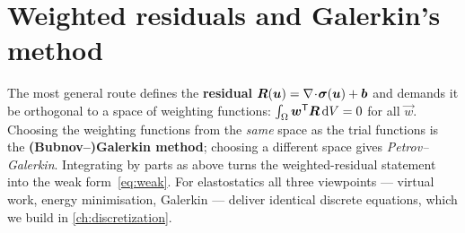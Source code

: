 \section{Weighted residuals and Galerkin's method}

The most general route defines the \textbf{residual}
$\bm{R}(\bm{u})=\nabla\!\cdot\!\bm{\sigma}(\bm{u})+\bm{b}$ and demands it be
orthogonal to a space of weighting functions:
$\int_\Omega \bm{w}^{\mathsf{T}}\bm{R}\,\mathrm{d} V=0$ for all $\vec w$. Choosing
the weighting functions from the \emph{same} space as the trial
functions is the \textbf{(Bubnov--)Galerkin method}; choosing a
different space gives \emph{Petrov--Galerkin}. Integrating by parts as
above turns the weighted-residual statement into the weak
form~\eqref{eq:weak}. For elastostatics all three viewpoints --- virtual
work, energy minimisation, Galerkin --- deliver identical discrete
equations, which we build in \cref{ch:discretization}.
